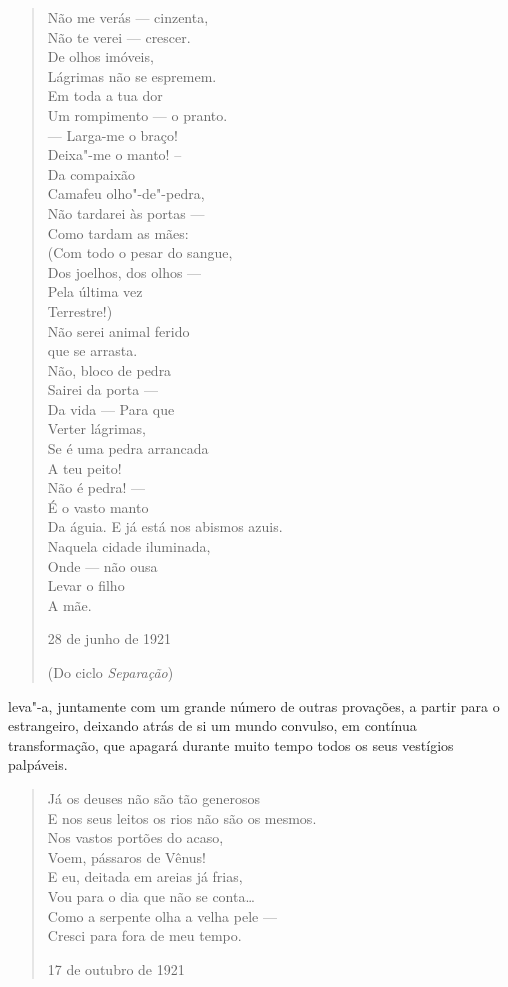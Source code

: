 \begin{verse}
Não me verás --- cinzenta, \\
Não te verei --- crescer. \\
De olhos imóveis, \\
Lágrimas não se espremem. \\[8pt]
Em toda a tua dor \\
Um rompimento --- o pranto. \\
--- Larga-me o braço! \\
Deixa"-me o manto! -- \\[8pt]
Da compaixão \\
Camafeu olho"-de"-pedra, \\
Não tardarei às portas --- \\
Como tardam as mães: \\[8pt]
(Com todo o pesar do sangue, \\
Dos joelhos, dos olhos --- \\
Pela última vez \\
Terrestre!) \\
Não serei animal ferido \\
que se arrasta. \\[8pt]
Não, bloco de pedra \\
Sairei da porta --- \\
Da vida --- Para que \\
Verter lágrimas, \\
Se é uma pedra arrancada \\
A teu peito! \\[8pt]
Não é pedra! --- \\
É o vasto manto \\
Da águia. E já está nos abismos azuis. \\
Naquela cidade iluminada, \\
Onde --- não ousa \\
Levar o filho \\
A mãe.

28 de junho de 1921

(Do ciclo \emph{Separação})

\end{verse}

\noindent{}leva"-a, juntamente com um grande número de outras provações, a
partir para o estrangeiro, deixando atrás de si um mundo convulso,
em contínua transformação, que apagará durante muito tempo todos os
seus vestígios palpáveis.

\begin{verse}
Já os deuses não são tão generosos \\
E nos seus leitos os rios não são os mesmos. \\
Nos vastos portões do acaso, \\
Voem, pássaros de Vênus! \\[8pt]
E eu, deitada em areias já frias, \\
Vou para o dia que não se conta\ldots{} \\
Como a serpente olha a velha pele --- \\
Cresci para fora de meu tempo. 

17 de outubro de 1921

\end{verse}

